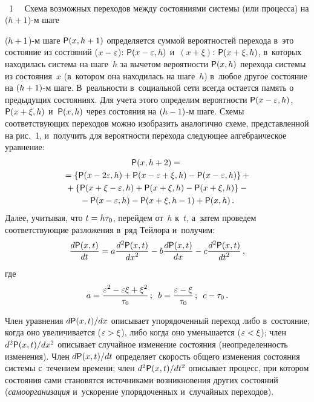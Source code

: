 \begin{multicols}{2}
{ \begin{center}  %
 \vspace*{-1pt}
    \mbox{%
\epsfxsize=77.502mm
}

\end{center}

\noindent
{{\figurename~1}\ \ \small{
Схема возможных переходов между состояниями системы (или процесса) на ($h + 1$)-м шаге
}}}


\vspace*{14pt}

\addtocounter{figure}{1}

\noindent
 ($h\hm+1$)-м шаге ${\sf P}(x, h\hm+1)$ определяется 
суммой вероятностей перехода в~это состояние из состояний ($x\hm-
\varepsilon$): ${\sf P}(x-\varepsilon, h)$ и~$(x+\xi)$: ${\sf P}(x+\xi, h)$, в~которых 
находилась система на шаге~$h$ за вычетом вероятности ${\sf P}(x, h)$ перехода 
системы из состояния~$x$ (в~котором она находилась на шаге~$h$) в~любое 
другое состояние на $(h\hm+1)$-м шаге. В~реальности в~социальной сети 
всегда остается память о предыдущих состояниях. Для учета этого определим 
вероятности ${\sf P}(x\hm- \varepsilon,h)$, ${\sf P}(x\hm+\xi, h)$ и~${\sf P}(x, h)$ через 
состояния на $(h\hm-1)$-м шаге. Схемы соответствующих переходов можно 
изобразить аналогично схеме, представленной на рис.~1, и~получить для 
вероятности перехода следующее алгебраическое уравнение:
  \begin{multline*}
  {\sf P}(x,h+2)={}\\
  {}=\{ {\sf P}(x-2\varepsilon, h)+{\sf P}(x-\varepsilon+\xi, h) -{\sf P}(x-\varepsilon, 
h)\}+{}\\
  {}+ \{ {\sf P}(x+\xi-\varepsilon,h)+ {\sf P}(x+\xi,h) -{\sf P}(x+\xi,h)\} -{}\\
  {}-{\sf P}(x-\varepsilon,h)- {\sf P}(x+\xi, h-1)+ {\sf P}(x,h)\,.
\end{multline*}
Далее, учитывая, что $t\hm=h\tau_0$, перейдем от~$h$ к~$t$, а~затем проведем 
соответствующие разложения в~ряд Тейлора и~получим:
\begin{equation}
\displaystyle\frac{\displaystyle d{\sf P}(x,t)\mathstrut}{\displaystyle dt\mathstrut} =a\displaystyle\frac{\displaystyle  d^2{\sf P}(x,t)\mathstrut}{\displaystyle dx^2\mathstrut} -b\displaystyle\frac{\displaystyle  d{\sf P}(x,t)\mathstrut}{\displaystyle dx\mathstrut} -c\displaystyle\frac{\displaystyle  
d^2{\sf P}(x,t)\mathstrut}{\displaystyle dt^2\mathstrut}\,,
\label{e3-hv}
\end{equation}
где 
$$
a=\displaystyle\frac{\displaystyle \varepsilon^2-\varepsilon\xi+\xi^2\mathstrut}{\displaystyle \tau_0\mathstrut}\,;\enskip b=\displaystyle\frac{\displaystyle \varepsilon -
\xi\mathstrut}{\displaystyle \tau_0\mathstrut}\,;\enskip c-\tau_0\,.
$$
  
  Член уравнения $d{\sf P}(x,t)/dx$ описывает упорядоченный переход либо 
в~состояние, когда оно увеличивается ($\varepsilon\hm > \xi$), либо когда оно 
уменьшается ($\varepsilon \hm <\xi$); член $d^2{\sf P}(x,t)/dx^2$ описывает 
случайное изменение состояния (неопределенность изменения). Член 
$d{\sf P}(x,t)/dt$ определяет скорость общего изменения состояния системы 
с~течением времени; член $d^2{\sf P}(x,t)/dt^2$ описывает процесс, при котором 
состояния сами становятся источниками возникновения других состояний 
(\textit{самоорганизация} и~ускорение упорядоченных и~случайных переходов).
  

\end{multicols}
